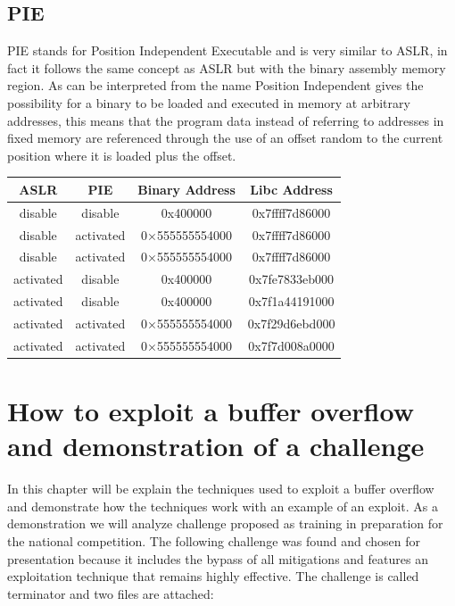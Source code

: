     \subsection{PIE}
    PIE stands for Position Independent Executable and is very similar to ASLR, in fact it follows the same concept as ASLR but with the binary assembly memory region.\newline
    As can be interpreted from the name Position Independent gives the possibility for a binary to be loaded and executed in memory at arbitrary addresses, this means that the program data instead of referring to addresses in fixed memory are referenced through the use of an offset random to the current position where it is loaded plus the offset.
    
    \begin{table}[h] %
      \centering
      \begin{tabular}{|c|c|c|c|}
        \hline
        ASLR  & PIE & Binary Address & Libc Address \\
        \hline
        disable & disable  & 0x400000 & 0x7ffff7d86000 \\
        disable & activated   & 0×555555554000 & 0x7ffff7d86000 \\
        disable & activated   & 0×555555554000 & 0x7ffff7d86000 \\
        activated  & disable  &  0x400000 & 0x7fe7833eb000 \\
        activated  & disable  &  0x400000& 0x7f1a44191000 \\
        activated  & activated   & 0×555555554000 & 0x7f29d6ebd000 \\
        activated  & activated   & 0×555555554000 & 0x7f7d008a0000 \\
        \hline
      \end{tabular}
    \end{table}
    \clearpage

    \section{How to exploit a buffer overflow and demonstration of a challenge}
    In this chapter will be explain the techniques used to exploit a buffer overflow and demonstrate how the techniques work with an example of an exploit.\newline
    As a demonstration we will analyze challenge proposed as training in preparation for the national competition.\newline
    The following challenge was found and chosen for presentation because it includes the bypass of all mitigations and features an exploitation technique that remains highly effective.\newline
    The challenge is called terminator and two files are attached:

